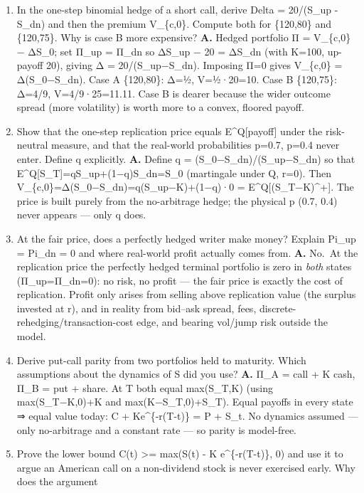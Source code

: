 \documentclass[
  11pt,
]{article}
\begin{document}
\begin{enumerate}
  (the χ\_k, ψ\_k closed forms), so the kink never enters a series.
\item
  In the one-step binomial hedge of a short call, derive Delta =
  20/(S\_up - S\_dn) and then the premium V\_\{c,0\}. Compute both for
  \{120,80\} and \{120,75\}. Why is case B more expensive? \textbf{A.}
  Hedged portfolio Π = V\_\{c,0\} − ΔS\_0; set Π\_up = Π\_dn so ΔS\_up −
  20 = ΔS\_dn (with K=100, up-payoff 20), giving Δ = 20/(S\_up−S\_dn).
  Imposing Π=0 gives V\_\{c,0\} = Δ(S\_0−S\_dn). Case A \{120,80\}: Δ=½,
  V=½·20=10. Case B \{120,75\}: Δ=4/9, V=4/9·25=11.11. Case B is dearer
  because the wider outcome spread (more volatility) is worth more to a
  convex, floored payoff.
\item
  Show that the one-step replication price equals E\^{}Q{[}payoff{]}
  under the risk-neutral measure, and that the real-world probabilities
  p=0.7, p=0.4 never enter. Define q explicitly. \textbf{A.} Define q =
  (S\_0−S\_dn)/(S\_up−S\_dn) so that
  E\^{}Q{[}S\_T{]}=qS\_up+(1−q)S\_dn=S\_0 (martingale under Q, r=0).
  Then V\_\{c,0\}=Δ(S\_0−S\_dn)=q(S\_up−K)+(1−q)·0 =
  E\^{}Q{[}(S\_T−K)\^{}+{]}. The price is built purely from the
  no-arbitrage hedge; the physical p (0.7, 0.4) never appears --- only q
  does.
\item
  At the fair price, does a perfectly hedged writer make money? Explain
  Pi\_up = Pi\_dn = 0 and where real-world profit actually comes from.
  \textbf{A.} No.~At the replication price the perfectly hedged terminal
  portfolio is zero in \emph{both} states (Π\_up=Π\_dn=0): no risk, no
  profit --- the fair price is exactly the cost of replication. Profit
  only arises from selling above replication value (the surplus invested
  at r), and in reality from bid--ask spread, fees,
  discrete-rehedging/transaction-cost edge, and bearing vol/jump risk
  outside the model.
\item
  Derive put-call parity from two portfolios held to maturity. Which
  assumptions about the dynamics of S did you use? \textbf{A.} Π\_A =
  call + K cash, Π\_B = put + share. At T both equal max(S\_T,K) (using
  max(S\_T−K,0)+K and max(K−S\_T,0)+S\_T). Equal payoffs in every state
  ⇒ equal value today: C + Ke\^{}\{-r(T-t)\} = P + S\_t. No dynamics
  assumed --- only no-arbitrage and a constant rate --- so parity is
  model-free.
\item
  Prove the lower bound C(t) \textgreater= max(S(t) - K
  e\^{}\{-r(T-t)\}, 0) and use it to argue an American call on a
  non-dividend stock is never exercised early. Why does the argument

\end{enumerate}
\end{document}
